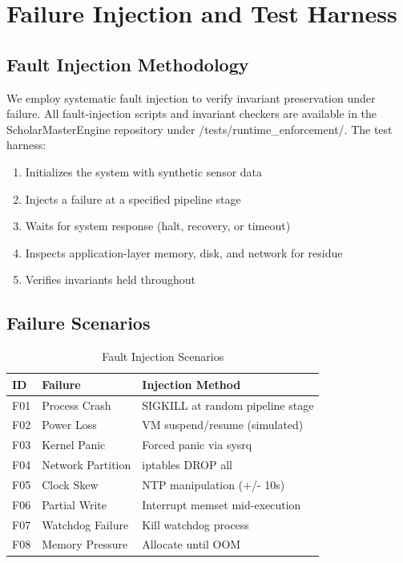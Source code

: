 \documentclass[conference]{IEEEtran}
\begin{document}
\section{Failure Injection and Test Harness}



\subsection{Fault Injection Methodology}
We employ systematic fault injection to verify invariant preservation under failure. All fault-injection scripts and invariant checkers are available in the ScholarMasterEngine repository under /tests/runtime\_enforcement/. The test harness:
\begin{enumerate}
    \item Initializes the system with synthetic sensor data
    \item Injects a failure at a specified pipeline stage
    \item Waits for system response (halt, recovery, or timeout)
    \item Inspects application-layer memory, disk, and network for residue
    \item Verifies invariants held throughout
\end{enumerate}

\subsection{Failure Scenarios}

\begin{table}[h]
\caption{Fault Injection Scenarios}
\centering
\begin{tabular}{p{1cm} p{2cm} p{4cm}}
\toprule
\textbf{ID} & \textbf{Failure} & \textbf{Injection Method} \\
\midrule
F01 & Process Crash & SIGKILL at random pipeline stage \\
F02 & Power Loss & VM suspend/resume (simulated) \\
F03 & Kernel Panic & Forced panic via sysrq \\
F04 & Network Partition & iptables DROP all \\
F05 & Clock Skew & NTP manipulation (+/- 10s) \\
F06 & Partial Write & Interrupt memset mid-execution \\
F07 & Watchdog Failure & Kill watchdog process \\
F08 & Memory Pressure & Allocate until OOM \\
\bottomrule
\end{tabular}
\label{tab:injection}
\end{table}
\end{document}
